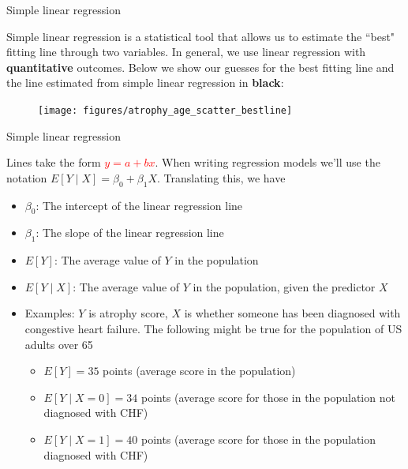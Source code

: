 \documentclass[10pt,t]{beamer}
\begin{document}
\begin{frame}{Simple linear regression}
	
	
	
Simple linear regression is a statistical tool that allows us to estimate the ``best" fitting line through two variables. In general, we use linear regression with \textbf{quantitative} outcomes. Below we show our guesses for the best fitting line and the line estimated from simple linear regression in \textbf{black}:

\begin{figure}
	\centering \texttt{[image: figures/atrophy\_age\_scatter\_bestline]}
\end{figure}

\end{frame}

\begin{frame}{Simple linear regression}
	
	\vspace{-5 mm}
	
Lines take the form \textcolor{red}{$y = a + bx$}. When writing regression models we'll use the notation $E[Y \mid X] = \beta_0 + \beta_1 X$. Translating this, we have

\vspace{0.3cm}

\begin{itemize}
	\item $\beta_0$: The intercept of the linear regression line
	\item $\beta_1$: The slope of the linear regression line
	\item $E[Y]$: The average value of $Y$ in the population
	\item $E[Y \mid X]$: The average value of $Y$ in the population, given the predictor $X$ \pause
	\smallskip
	\item Examples: $Y$ is atrophy score, $X$ is whether someone has been diagnosed with congestive heart failure. The following might be true for the population of US adults over 65
	\begin{itemize}
		\smallskip
		\item $E[Y] = 35$ points (average score in the population)
		\item $E[Y \mid X = 0] = 34$ points (average score for those in the population not diagnosed with CHF)
		\item $E[Y \mid X = 1] = 40$ points (average score for those in the population diagnosed with CHF)
	\end{itemize}
\end{itemize}
\end{frame}
\end{document}
